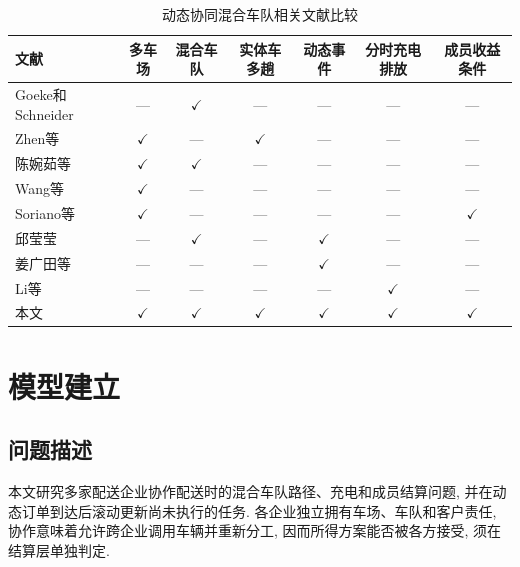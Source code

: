 \documentclass{setp-new}
\newcommand{\setptabsetup}{\fontsize{9pt}{10.5pt}\selectfont\renewcommand{\arraystretch}{0.95}\setlength{\tabcolsep}{2.2pt}\setlength{\aboverulesep}{0.4pt}\setlength{\belowrulesep}{0.4pt}\hbadness=10000}
\begin{document}
\begin{table}[H]
\centering
\caption{动态协同混合车队相关文献比较}
\label{tab:literature-comparison}
\setptabsetup
\begin{tabular*}{\linewidth}{@{\extracolsep{\fill}}lcccccc@{}}
\toprule
文献 & 多车场 & 混合车队 & 实体车多趟 & 动态事件 & 分时充电排放 & 成员收益条件\\
\midrule
Goeke和Schneider\cite{ref:27} & --- & $\checkmark$ & --- & --- & --- & ---\\
Zhen等\cite{ref:44} & $\checkmark$ & --- & $\checkmark$ & --- & --- & ---\\
陈婉茹等\cite{ref:23} & $\checkmark$ & $\checkmark$ & --- & --- & --- & ---\\
Wang等\cite{ref:7} & $\checkmark$ & --- & --- & --- & --- & ---\\
Soriano等\cite{ref:8} & $\checkmark$ & --- & --- & --- & --- & $\checkmark$\\
邱莹莹\cite{ref:71} & --- & $\checkmark$ & --- & $\checkmark$ & --- & ---\\
姜广田等\cite{ref:51} & --- & --- & --- & $\checkmark$ & --- & ---\\
Li等\cite{ref:52} & --- & --- & --- & --- & $\checkmark$ & ---\\
本文 & $\checkmark$ & $\checkmark$ & $\checkmark$ & $\checkmark$ & $\checkmark$ & $\checkmark$\\
\bottomrule
\end{tabular*}
\end{table}


\section{模型建立}

\subsection{问题描述}

本文研究多家配送企业协作配送时的混合车队路径、充电和成员结算问题,
并在动态订单到达后滚动更新尚未执行的任务.
各企业独立拥有车场、车队和客户责任, 协作意味着允许跨企业调用车辆并重新分工,
因而所得方案能否被各方接受, 须在结算层单独判定.
\end{document}
